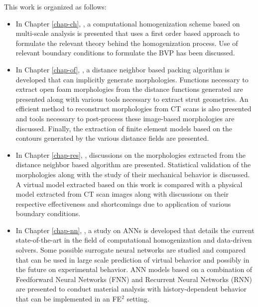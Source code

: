 This work is organized as follows:
\begin{itemize}
	\item In Chapter \ref{chap-ch}, \textit{\titlech}, a computational homogenization scheme based on multi-scale analysis is presented that uses a first order based approach to formulate the relevant theory behind the homogenization process. Use of relevant boundary conditions to formulate the BVP has been discussed. 
	\item In Chapter \ref{chap-of}, \textit{\titleof}, a distance neighbor based packing algorithm is developed that can implicitly generate morphologies. Functions necessary to extract open foam morphologies from the distance functions generated are presented along with various tools necessary to extract strut geometries. An efficient method to reconstruct morphologies from CT scans is also presented and tools necessary to post-process these image-based morphologies are discussed. Finally, the extraction of finite element models based on the contours generated by the various distance fields are presented.
	\item In Chapter \ref{chap-res}, \textit{\titleres}, discussions on the morphologies extracted from the distance neighbor based algorithm are presented. Statistical validation of the morphologies along with the study of their mechanical behavior is discussed. A virtual model extracted based on this work is compared with a physical model extracted from CT scan images along with discussions on their respective effectiveness and shortcomings due to application of various boundary conditions.
	\item In Chapter \ref{chap-nn}, \textit{\titlenn}, a study on ANNs is developed that details the current state-of-the-art in the field of computational homogenization and data-driven solvers. Some possible surrogate neural networks are studied and compared that can be used in large scale prediction of virtual behavior and possibly in the future on experimental behavior. ANN models based on a combination of Feedforward Neural Networks (FNN) and Recurrent Neural Networks (RNN) are presented to conduct material analysis with history-dependent behavior that can be implemented in an FE$^2$ setting.
\end{itemize}

